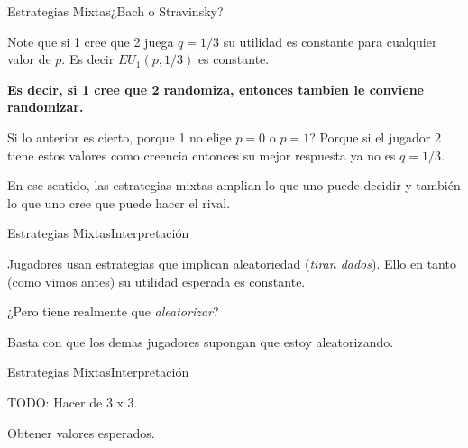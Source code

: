 \documentclass[notes, 11pt]{beamer} %
\newenvironment{wideitemize}{\itemize\addtolength{\itemsep}{10pt}}{\enditemize}
\begin{document}
\begin{frame}{Estrategias Mixtas}{¿Bach o Stravinsky?}
\begin{wideitemize}
	\item<1-> Note que si 1 cree que 2 juega $q = 1/3$ su utilidad es constante para cualquier valor de $p$. Es decir $EU_{1}(p,1/3)$ es constante. 
	\item<2-> \textbf{Es decir, si 1 cree que 2 randomiza, entonces tambien le conviene randomizar.}
	\item<3-> Si lo anterior es cierto, porque 1 no elige $p=0$ o $p=1$? Porque si el jugador 2 tiene estos valores como creencia entonces su mejor respuesta ya no es $q=1/3$.
	\item<4-> En ese sentido, las estrategias mixtas amplian lo que uno puede decidir y tambi\'en lo que uno cree que puede hacer el rival.
\end{wideitemize}
\end{frame}

\begin{frame}{Estrategias Mixtas}{Interpretaci\'on}
\begin{wideitemize}
	\item<1-> Jugadores usan estrategias que implican aleatoriedad (\textit{tiran dados}). Ello en tanto (como vimos antes) su utilidad esperada es constante.
	\item<2-> ¿Pero tiene realmente que \textit{aleatorizar}?
	\begin{wideitemize}
		\item<3->[--] Basta con que los demas jugadores supongan que estoy aleatorizando.
	\end{wideitemize}
\end{wideitemize}
\end{frame}

\begin{frame}{Estrategias Mixtas}{Interpretaci\'on}
\begin{wideitemize}
	\item<1-> TODO: Hacer de 3 x 3.
	\item<2-> Obtener valores esperados.
\end{wideitemize}
\end{frame}
\end{document}
